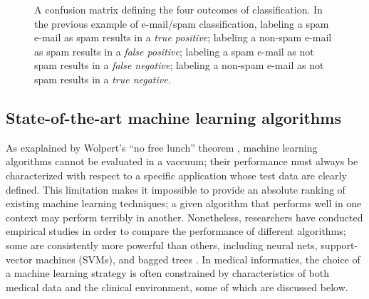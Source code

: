 \documentclass[12pt]{article} %
\begin{document}
\begin{figure}[h]\label{confusion_matrix}
\begin{center}
\end{center}
\caption{A confusion matrix defining the four outcomes of classification. In the previous example of e-mail/spam classification, labeling a spam e-mail as spam results in a \textit{true positive}; labeling a non-spam e-mail as spam results in a \textit{false positive}; labeling a spam e-mail as not spam results in a \textit{false negative}; labeling a non-spam e-mail as not spam results in a \textit{true negative}.}
\end{figure}

\subsection{State-of-the-art machine learning algorithms}
As exaplained by Wolpert's ``no free lunch'' theorem \cite{wolpert1995}, machine learning algorithms cannot be evaluated in a vaccuum; their performance must always be characterized with respect to a specific application whose test data are clearly defined. This limitation makes it impossible to provide an absolute ranking of existing machine learning techniques; a given algorithm that performs well in one context may perform terribly in another. Nonetheless, researchers have conducted empirical studies in order to compare the performance of different algorithms; some are consistently more powerful than others, including neural nets, support-vector machines (SVMs), and bagged trees \cite{caruana2006}. In medical informatics, the choice of a machine learning strategy is often constrained by characteristics of both medical data and the clinical environment, some of which are discussed below.
\end{document}
